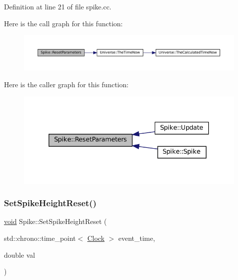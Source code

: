Definition at line 21 of file spike.\+cc.

Here is the call graph for this function\+:\nopagebreak
\begin{figure}[H]
\begin{center}
\leavevmode
\includegraphics[width=350pt]{class_spike_af4475560da7a33e70a0f2036197f000f_cgraph}
\end{center}
\end{figure}
Here is the caller graph for this function\+:\nopagebreak
\begin{figure}[H]
\begin{center}
\leavevmode
\includegraphics[width=333pt]{class_spike_af4475560da7a33e70a0f2036197f000f_icgraph}
\end{center}
\end{figure}
\mbox{\label{class_spike_a872adf39d66b0f491fb179c9745d7d11}} 
\subsubsection{\texorpdfstring{Set\+Spike\+Height\+Reset()}{SetSpikeHeightReset()}}
{\footnotesize\ttfamily \mbox{\hyperlink{glad_8h_a950fc91edb4504f62f1c577bf4727c29}{void}} Spike\+::\+Set\+Spike\+Height\+Reset (\begin{DoxyParamCaption}\item[{std\+::chrono\+::time\+\_\+point$<$ \mbox{\hyperlink{universe_8h_a0ef8d951d1ca5ab3cfaf7ab4c7a6fd80}{Clock}} $>$}]{event\+\_\+time,  }\item[{double}]{val }\end{DoxyParamCaption})\hspace{0.3cm}{\ttfamily [inline]}}



